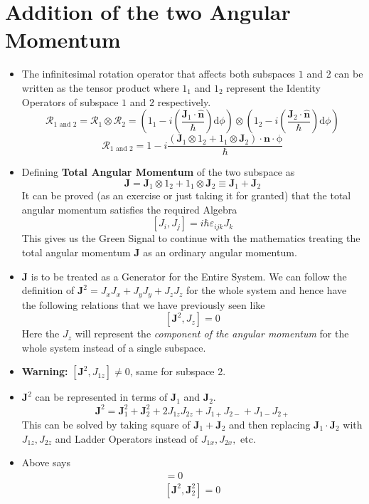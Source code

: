 \documentclass[10pt]{article}
\newcommand{\hb}{\hbar}
\renewcommand{\vec}{\mathbf}
\renewcommand{\vec}{\mathbf}
\begin{document}
\section{Addition of the two Angular Momentum}
\begin{itemize}
	\item The infinitesimal rotation operator that affects both subspaces $1$ and 2 can be written as the tensor product where $1_1$ and $1_2$ represent the Identity Operators of subspace $1$ and $2$ respectively. 
		\[ \mathcal R_{1 \text{ and } 2} = 
		\mathcal R_1 \otimes \mathcal R_2 = 
		\left( 1_1 - i \left(\frac{\vec{J}_1 \cdot  \hat{\vec{n}}}{\hb}\right) \mathrm{d} \phi
			\right) \otimes 
		\left( 1_2 - i \left(\frac{\vec{J}_2 \cdot  \hat{\vec{n}}}{\hb}\right) \mathrm{d} \phi
		\right) \]  \[\mathcal R_{1 \text{ and } 2} =  1 - i\frac{(\vec{J}_1 \otimes 1_{2} + 1_{1} \otimes \vec{J}_2 ) \cdot  \vec{n} \cdot  \mathrm \phi}{ \hb}
		\] 
	\item Defining \textbf{Total Angular Momentum} of the two subspace as 
		\[
\vec{J} = \vec{J}_1 \otimes 1_{2} + 1_{1} \otimes \vec{J}_2  \equiv \vec{J}_1 + \vec{J}_2
		\] 
It can be proved (as an exercise or just taking it for granted) that the total angular momentum satisfies the required Algebra
\[
	[ J_i , J_j ] = i \hb \varepsilon_{ijk} J_k 
\] 
This gives us the Green Signal to continue with the mathematics treating the total angular momentum $\vec{J}$ as an ordinary angular momentum.
\item $\vec{J}$ is to be treated as a Generator for the Entire System. We can follow the definition of $\vec{J}^2 = J_x J_x + J_y J_y + J_z J_z$ for the whole system and hence have the following relations that we have previously seen like 
	\[
		[\vec{J}^2 , J_z ] = 0 
	\] 
Here the $J_z$ will represent the \emph{component of the angular momentum} for the whole system instead of a single subspace.
\item \textbf{Warning:} $[\vec{J}^2 , J_{1z}] \neq  0$, same for subspace 2.
\item $\vec{J}^2$ can be represented in terms of $\vec{J}_1$ and $\vec{J}_2$.
	\begin{equation}
		\vec{J}^2 = \vec{J}_1 ^2 + \vec{J}_2 ^2 + 2 J_{1z} J_{2z} + J_{1+} J_{2-} + J_{1-} J_{2+}	
	\end{equation} 
	This can be solved by taking square of $\vec{J}_1 + \vec{J}_2$ and then replacing $\vec{J}_1 \cdot \vec{J}_2$ with $J_{1z}, J_{2z}$ and Ladder Operators instead of $J_{1x},J_{2x},$ etc. 
\item Above says 
\begin{align}
	[\vec{J}^2 , \vec{J}_1^2 ] = 0\\
	[\vec{J}^2 , \vec{J}_2^2 ] = 0
\end{align}
\end{itemize}
\end{document}
